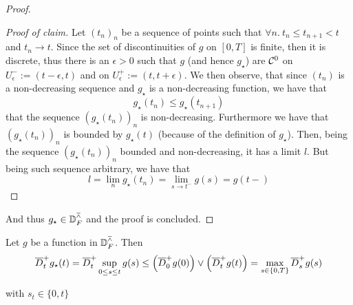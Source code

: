 \begin{proof}
\begin{proof}[Proof of claim]
		Let $(t_n)_n$ be a sequence of points such that $\forall n. \: t_n \leq t_{n+1} <t$ and $t_n \longrightarrow t$.
		Since the set of discontinuities of $g$ on $[0,T]$ is finite, then it is discrete, thus there is an $\epsilon>0$ such that $g$ (and hence $g_\star$) are $\mathcal{C}^0$ on $U_\epsilon^- := (t-\epsilon, t)$ and on $U_\epsilon^+:= (t,t+\epsilon)$.
		We then observe, that since $(t_n)$ is a non-decreasing sequence and $g_\star$ is a non-decreasing function, we have that 
		\begin{equation}
			g_\star (t_n) \leq g_\star ( t_{n+1} )
		\end{equation}
		\ie that the sequence $( g_\star (t_n) )_n$ is non-decreasing.
		Furthermore we have that $( g_\star (t_n) )_n$ is bounded by $g_\star(t)$ (because of the definition of $g_\star$).
		Then, being the sequence $( g_\star (t_n) )_n$ bounded and non-decreasing, it has a limit $l$.
		But being such sequence arbitrary, we have that
		\begin{equation}
			l = \lim_n g_\star (t_n) = \lim_{s\rightarrow t^-} g(s) = g(t-)
		\end{equation}
	\end{proof}
	And thus $g_\star \in \mathbb{D}_F^\barwedge$ and the proof is concluded.
\end{proof}

\begin{lemma}
Let $g$ be a function in $\mathbb{D}_F^\barwedge$.
Then
\begin{equation}\label{ch4:eq:sup-dini-exchange}
\overline{D}^+_t g_\star(t)
=
\overline{D}^+_t \sup_{0\leq s \leq t} g(s) 
\leq
	\left(
	\overline{D}^+_0 g(0)
	\right)
	\vee 
	\left(
	\overline{D}^+_t g(t)
	\right) 
=
	\max_{s\in\{0,T\}}
	\overline{D}^+_s g(s)
\end{equation}

with $s_t \in \{ 0, t\}$
\end{lemma}

